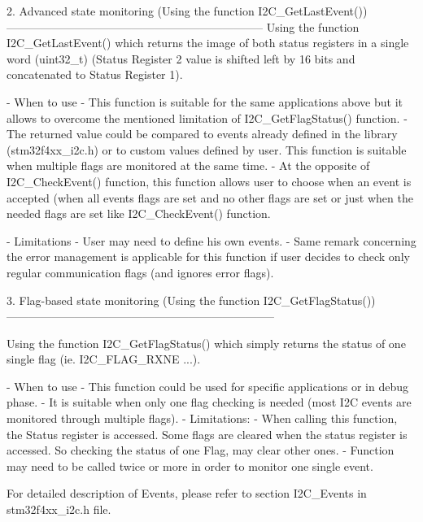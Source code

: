 \begin{DoxyVerb}
 
     2. Advanced state monitoring (Using the function I2C_GetLastEvent())
     -------------------------------------------------------------------- 
        Using the function I2C_GetLastEvent() which returns the image of both status 
        registers in a single word (uint32_t) (Status Register 2 value is shifted left 
        by 16 bits and concatenated to Status Register 1).

          - When to use
             - This function is suitable for the same applications above but it 
               allows to overcome the mentioned limitation of I2C_GetFlagStatus() 
               function.
             - The returned value could be compared to events already defined in 
               the library (stm32f4xx_i2c.h) or to custom values defined by user.
               This function is suitable when multiple flags are monitored at the 
               same time.
             - At the opposite of I2C_CheckEvent() function, this function allows 
               user to choose when an event is accepted (when all events flags are 
               set and no other flags are set or just when the needed flags are set 
               like I2C_CheckEvent() function.

          - Limitations
             - User may need to define his own events.
             - Same remark concerning the error management is applicable for this 
               function if user decides to check only regular communication flags 
               (and ignores error flags).
      
 
     3. Flag-based state monitoring (Using the function I2C_GetFlagStatus())
     -----------------------------------------------------------------------
     
      Using the function I2C_GetFlagStatus() which simply returns the status of 
      one single flag (ie. I2C_FLAG_RXNE ...). 

          - When to use
             - This function could be used for specific applications or in debug 
               phase.
             - It is suitable when only one flag checking is needed (most I2C 
               events are monitored through multiple flags).
          - Limitations: 
             - When calling this function, the Status register is accessed. 
               Some flags are cleared when the status register is accessed. 
               So checking the status of one Flag, may clear other ones.
             - Function may need to be called twice or more in order to monitor 
               one single event.
 
   For detailed description of Events, please refer to section I2C_Events in 
   stm32f4xx_i2c.h file.\end{DoxyVerb}
 

